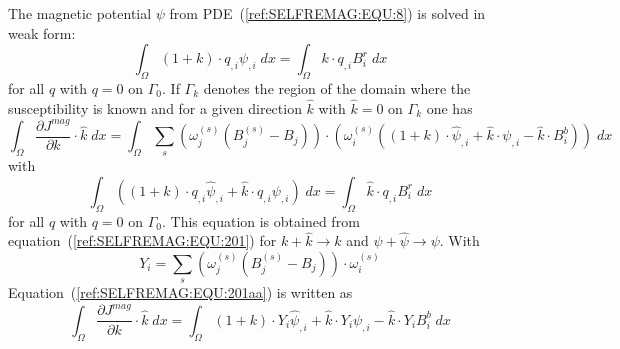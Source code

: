 The magnetic potential $\psi$ from PDE~(\ref{ref:SELFREMAG:EQU:8}) is solved in weak form:
\begin{equation}\label{ref:SELFREMAG:EQU:201}
\int_{\Omega} 
(1+k) \cdot q_{,i} \psi_{,i} \; dx  = \int_{\Omega}  k \cdot q_{,i}  B^r_i \; dx 
\end{equation} 
for all $q$ with $q=0$ on $\Gamma_{0}$.
If $\Gamma_{k}$ denotes the region of the domain where the susceptibility is
known and for a given direction $\hat{k}$ with $\hat{k}=0$ on $\Gamma_{k}$ one has
\begin{equation}\label{ref:SELFREMAG:EQU:201aa}
\int_{\Omega}   \frac{\partial J^{mag}}{\partial k} \cdot \hat{k} \; dx  = \int_{\Omega}  
\sum_{s} (\omega^{(s)}_j 
( B^{(s)}_j-B_{j}))  \cdot ( \omega^{(s)}_i ( (1+k) \cdot \hat{\psi}_{,i} + \hat{k} \cdot \psi_{,i} - \hat{k}  \cdot B^b_i  ) ) \; dx  
\end{equation} 
with
\begin{equation}\label{ref:SELFREMAG:EQU:201A}
\int_{\Omega} \left(
(1+k) \cdot q_{,i} \hat{\psi}_{,i} + 
\hat{k}  \cdot q_{,i} \psi_{,i} \right) 
\; dx  
= \int_{\Omega} \hat{k} \cdot q_{,i}  B^r_i \; dx 
\end{equation} 
for all $q$ with $q=0$ on $\Gamma_{0}$. This equation is obtained from equation~(\ref{ref:SELFREMAG:EQU:201})
for $k+\hat{k} \rightarrow  k$ and $\psi+\hat{\psi} \rightarrow \psi$. 
With
\begin{equation}\label{ref:SELFREMAG:EQU:202c}
Y_i =   \sum_{s} (\omega^{(s)}_j 
(B^{(s)}_j - B_{j}) )  \cdot \omega^{(s)}_i  
\end{equation} 
Equation~(\ref{ref:SELFREMAG:EQU:201aa}) is written as 
\begin{equation}\label{ref:SELFREMAG:EQU:202cc}
\int_{\Omega}   \frac{\partial J^{mag}}{\partial k} \cdot \hat{k} \;  dx  = \int_{\Omega}  
(1+k) \cdot  Y_i \hat{\psi}_{,i}  + \hat{k} \cdot  Y_i \psi_{,i} - \hat{k}  \cdot Y_i B^b_i   \; dx  
\end{equation} 

